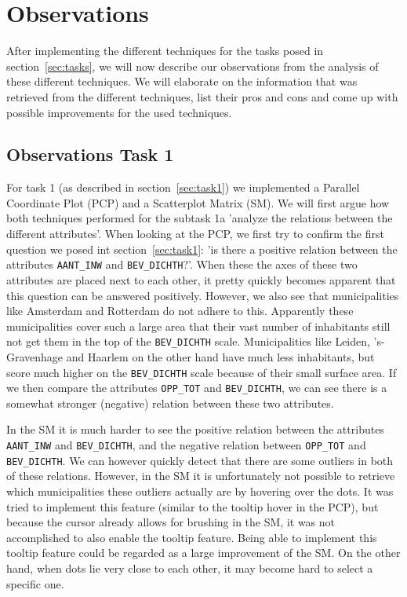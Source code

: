 \section{Observations}\label{sec:observations}
After implementing the different techniques for the tasks posed in section~\ref{sec:tasks}, we will now describe our observations from the analysis of these different techniques. We will elaborate on the information that was retrieved from the different techniques, list their pros and cons and come up with possible improvements for the used techniques.

\subsection{Observations Task 1}
For task 1 (as described in section~\ref{sec:task1}) we implemented a Parallel Coordinate Plot (PCP) and a Scatterplot Matrix (SM). We will first argue how both techniques performed for the subtask 1a 'analyze the relations between the different attributes'. When looking at the PCP, we first try to confirm the first question we posed int section~\ref{sec:task1}: 'is there a positive relation between the attributes \texttt{AANT\_INW} and \texttt{BEV\_DICHTH}?'. When these the axes of these two attributes are placed next to each other, it pretty quickly becomes apparent that this question can be answered positively. However, we also see that municipalities like Amsterdam and Rotterdam do not adhere to this. Apparently these municipalities cover such a large area that their vast number of inhabitants still not get them in the top of the \texttt{BEV\_DICHTH} scale. Municipalities like Leiden, 's-Gravenhage and Haarlem on the other hand have much less inhabitants, but score much higher on the \texttt{BEV\_DICHTH} scale because of their small surface area. If we then compare the attributes \texttt{OPP\_TOT} and \texttt{BEV\_DICHTH}, we can see there is a somewhat stronger (negative) relation between these two attributes.

In the SM it is much harder to see the positive relation between the attributes \texttt{AANT\_INW} and \texttt{BEV\_DICHTH}, and the negative relation between \texttt{OPP\_TOT} and \texttt{BEV\_DICHTH}. We can however quickly detect that there are some outliers in both of these relations. However, in the SM it is unfortunately not possible to retrieve which municipalities these outliers actually are by hovering over the dots. It was tried to implement this feature (similar to the tooltip hover in the PCP), but because the cursor already allows for brushing in the SM, it was not accomplished to also enable the tooltip feature. Being able to implement this tooltip feature could be regarded as a large improvement of the SM. On the other hand, when dots lie very close to each other, it may become hard to select a specific one.

